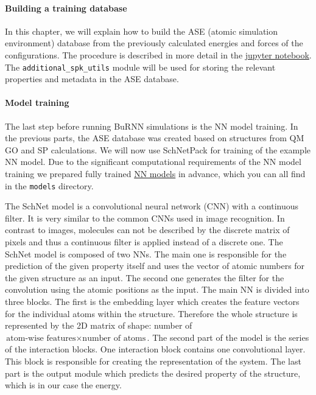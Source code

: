 \paragraph{Building a training database}
In this chapter, we will explain how to build the ASE (atomic simulation environment) \cite{Larsen2017ASE} database from the previously calculated energies and forces of the configurations. The procedure is described in more detail in the \href{https://github.com/LierB/gromos_tutorial_livecoms/blob/burnn_tutorial_rc/tutorial_files/t_06/train_dataset_tutorial/tutorial_v2.ipynb}{jupyter notebook}. The \texttt{additional\_spk\_utils} module will be used for storing the relevant properties and metadata in the ASE database. 


\paragraph{Model training}
The last step before running BuRNN simulations is the NN model training. In the previous parts, the ASE database was created based on structures from QM GO and SP calculations. We will now use SchNetPack for training of the example NN model. Due to the significant computational requirements of the NN model training we prepared fully trained \href{https://github.com/LierB/gromos_tutorial_livecoms/tree/burnn_tutorial_rc/tutorial_files/t_06/models}{NN models} in advance, which you can all find in the \texttt{models} directory. 


The SchNet model \cite{Schuett2018SchNet} is a convolutional neural network (CNN) with a continuous filter. It is very similar to the common CNNs used in image recognition. In contrast to images, molecules can not be described by the discrete matrix of pixels and thus a continuous filter is applied instead of a discrete one. The SchNet model is composed of two NNs. The main one is responsible for the prediction of the given property itself and uses the vector of atomic numbers for the given structure as an input. The second one generates the filter for the convolution using the atomic positions as the input. The main NN is divided into three blocks. The first is the embedding layer which creates the feature vectors for the individual atoms within the structure. Therefore the whole structure is represented by the 2D matrix of shape: number of $\text{atom-wise features}\times \text{number of atoms}$. The second part of the model is the series of the interaction blocks. One interaction block contains one convolutional layer. This block is responsible for creating the representation of the system. The last part is the output module which predicts the desired property of the structure, which is in our case the energy.

